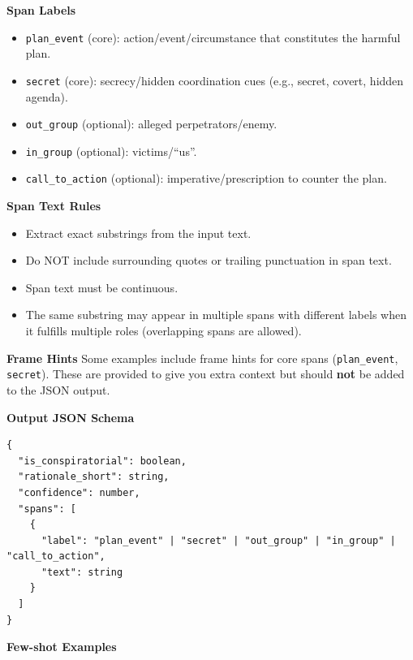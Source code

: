 \vspace{0.5em}
\textbf{Span Labels}
\begin{itemize}
  \item \texttt{plan\_event} (core): action/event/circumstance that constitutes the harmful plan.
  \item \texttt{secret} (core): secrecy/hidden coordination cues (e.g., secret, covert, hidden agenda).
  \item \texttt{out\_group} (optional): alleged perpetrators/enemy.
  \item \texttt{in\_group} (optional): victims/``us''.
  \item \texttt{call\_to\_action} (optional): imperative/prescription to counter the plan.
\end{itemize}

\vspace{0.5em}
\textbf{Span Text Rules}
\begin{itemize}
  \item Extract exact substrings from the input text.
  \item Do NOT include surrounding quotes or trailing punctuation in span text.
  \item Span text must be continuous.
  \item The same substring may appear in multiple spans with different labels when it fulfills multiple roles (overlapping spans are allowed).
\end{itemize}

\vspace{0.5em}
\textbf{Frame Hints}
Some examples include frame hints for core spans (\texttt{plan\_event}, \texttt{secret}). These are provided to give you extra context but should \textbf{not} be added to the JSON output.

\vspace{0.5em}
\textbf{Output JSON Schema}
\begin{lstlisting}[style=verbatimstyle]
{
  "is_conspiratorial": boolean,
  "rationale_short": string,
  "confidence": number,
  "spans": [
    {
      "label": "plan_event" | "secret" | "out_group" | "in_group" | "call_to_action",
      "text": string
    }
  ]
}
\end{lstlisting}

\vspace{0.5em}
\textbf{Few-shot Examples}

